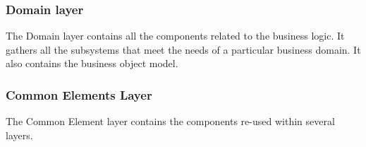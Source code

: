 \documentclass[10pt,a4paper]{article}
\begin{document}
\subsubsection{	Domain layer}
The Domain layer contains all the components related to the business logic. It gathers all the subsystems that meet the needs of a particular business domain. It also contains the business object model.

\subsubsection{	Common Elements Layer}
The Common Element layer contains the components re-used within several layers.
\end{document}
